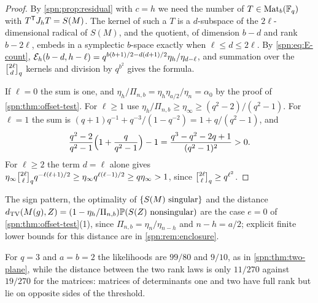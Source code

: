 \begin{proof}
By \cref{spn:prop:residual} with $c=h$ we need the number of $T\in\operatorname{Mat}_b(\mathbb{F}_q)$ with
$T^{\mathsf{T}}J_hT=S(M)$. The kernel of such a $T$ is a $d$-subspace of the $2\ell$-dimensional
radical of $S(M)$, and the quotient, of dimension $b-d$ and rank $b-2\ell$, embeds in a
symplectic $b$-space exactly when $\ell\le d\le2\ell$. By \eqref{spn:eq:E-count},
$\mathcal{E}_h(b-d,h-\ell)=q^{b(b+1)/2-d(d+1)/2}\eta_h/\eta_{d-\ell}$, and summation over the
$\spnqbin{2\ell}dq$ kernels and division by $q^{b^2}$ gives the formula.

If $\ell=0$ the sum is one, and $\eta_h/\Pi_{n,b}=\eta_h\eta_{a/2}/\eta_n=\alpha_0$ by the
proof of \cref{spn:thm:offset-test}. For
$\ell\ge1$ use $\eta_h/\Pi_{n,b}\ge\eta_\infty\ge(q^2-2)/(q^2-1)$. For $\ell=1$ the sum is
$(q+1)q^{-1}+q^{-3}/(1-q^{-2})=1+q/(q^2-1)$, and
\[
 \frac{q^2-2}{q^2-1}\Bigl(1+\frac{q}{q^2-1}\Bigr)-1=\frac{q^3-q^2-2q+1}{(q^2-1)^2}>0 .
\]
For $\ell\ge2$ the term $d=\ell$ alone gives
$\eta_\infty\spnqbin{2\ell}{\ell}{q}q^{-\ell(\ell+1)/2}\ge\eta_\infty q^{\ell(\ell-1)/2}\ge
q\eta_\infty>1$, since $\spnqbin{2\ell}\ell q\ge q^{\ell^2}$.
\end{proof}

The sign pattern, the optimality of $\{S(M)\text{ singular}\}$ and the distance
$d_{\mathrm{TV}}(M(g),Z)=(1-\eta_h/\Pi_{n,b})\mathbb{P}(S(Z)\text{ nonsingular})$ are the case $e=0$ of
\cref{spn:thm:offset-test}(1), since $\Pi_{n,b}=\eta_n/\eta_{n-h}$ and $n-h=a/2$; explicit
finite lower bounds for this distance are in \cref{spn:rem:enclosure}.

For $q=3$ and $a=b=2$ the likelihoods are $99/80$ and $9/10$, as in \cref{spn:thm:two-plane},
while the distance between the two rank laws is only $11/270$ against $19/270$ for the matrices:
matrices of determinants one and two have full rank but lie on opposite sides of the threshold.

